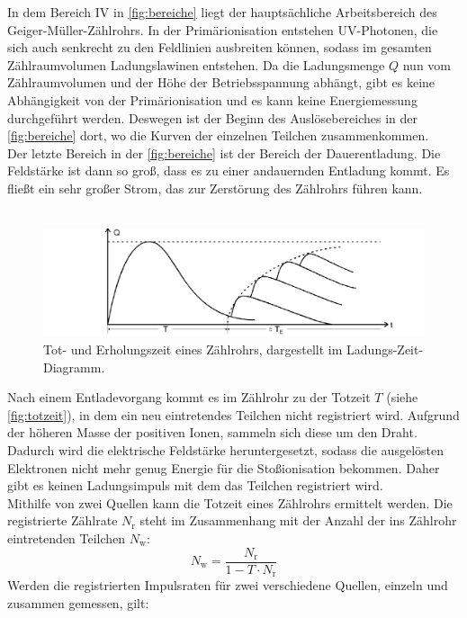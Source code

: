 In dem Bereich IV in \autoref{fig:bereiche} liegt der hauptsächliche Arbeitsbereich des Geiger-Müller-Zählrohrs. 
In der Primärionisation entstehen UV-Photonen, die sich auch senkrecht zu den Feldlinien ausbreiten können, sodass im gesamten Zählraumvolumen Ladungslawinen entstehen.
Da die Ladungsmenge $Q$ nun vom Zählraumvolumen und der Höhe der Betriebsspannung abhängt, gibt es keine Abhängigkeit von der Primärionisation und es kann keine Energiemessung durchgeführt werden.
Deswegen ist der Beginn des Auslösebereiches in der \autoref{fig:bereiche} dort, wo die Kurven der einzelnen Teilchen zusammenkommen.\\
Der letzte Bereich in der \autoref{fig:bereiche} ist der Bereich der Dauerentladung.
Die Feldstärke ist dann so groß, dass es zu einer andauernden Entladung kommt.
Es fließt ein sehr großer Strom, das zur Zerstörung des Zählrohrs führen kann.\\
\\
\begin{figure}
    \centering
    \includegraphics[width=\textwidth]{content/totzeit.pdf}
    \caption{Tot- und Erholungszeit eines Zählrohrs, dargestellt im Ladungs-Zeit-Diagramm.\cite{anleitung}}
    \label{fig:totzeit}
\end{figure}
Nach einem Entladevorgang kommt es im Zählrohr zu der Totzeit $T$ (siehe \autoref{fig:totzeit}), in dem ein neu eintretendes Teilchen nicht registriert wird.
Aufgrund der höheren Masse der positiven Ionen, sammeln sich diese um den Draht.
Dadurch wird die elektrische Feldstärke heruntergesetzt, sodass die ausgelösten Elektronen nicht mehr genug Energie für die Stoßionisation bekommen.
Daher gibt es keinen Ladungsimpuls mit dem das Teilchen registriert wird.\\
Mithilfe von zwei Quellen kann die Totzeit eines Zählrohrs ermittelt werden. 
Die registrierte Zählrate $N_{\text{r}}$ steht im Zusammenhang mit der Anzahl der ins Zählrohr eintretenden Teilchen $N_{\text{w}}$:
\begin{equation*}
    N_{\text{w}} = \frac{N_{\text{r}}}{1-T\cdot N_{\text{r}}}
\end{equation*}
Werden die registrierten Impulsraten für zwei verschiedene Quellen, einzeln und zusammen gemessen, gilt:
